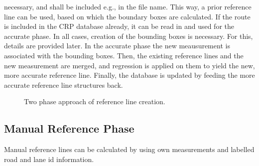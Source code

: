 \documentclass[sn-mathphys-num]{sn-jnl}%
\begin{document}
necessary, and shall be included e.g., in the file name. This way, a prior reference line can be used, based on which the boundary boxes are calculated.
If the route is included in the CRP database already, it can be read in and used for the accurate phase. In all cases, creation of the bounding boxes is necessary.
For this, details are provided later.\newline
In the accurate phase the new meausurement is associated with the bounding boxes. Then, the existing reference lines and the new measurement are merged, and regression is 
applied on them to yield the new, more accurate reference line. Finally, the database is updated by feeding the more accurate reference line structures back.
\begin{figure}[h]
    \caption{Two phase approach of reference line creation.}
    \label{fig:twoPhaseApproach}
\end{figure}

\subsection{Manual Reference Phase}
Manual reference lines can be calculated by using own measurements and labelled road and lane id information.
\newline \newline
{}
\end{document}
